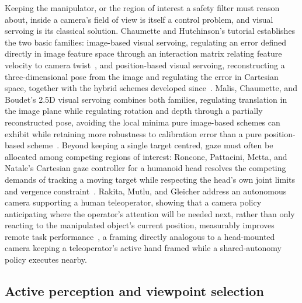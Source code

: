 \documentclass[12pt,a4paper,twoside,openright]{report}
\begin{document}
Keeping the manipulator, or the region of interest a safety filter must reason about, inside a camera's field of view is itself a control problem, and visual servoing is its classical solution. Chaumette and Hutchinson's tutorial establishes the two basic families: image-based visual servoing, regulating an error defined directly in image feature space through an interaction matrix relating feature velocity to camera twist~\cite{chaumette2006}, and position-based visual servoing, reconstructing a three-dimensional pose from the image and regulating the error in Cartesian space, together with the hybrid schemes developed since~\cite{chaumette2007advanced}. Malis, Chaumette, and Boudet's 2.5D visual servoing combines both families, regulating translation in the image plane while regulating rotation and depth through a partially reconstructed pose, avoiding the local minima pure image-based schemes can exhibit while retaining more robustness to calibration error than a pure position-based scheme~\cite{malis1999}. Beyond keeping a single target centred, gaze must often be allocated among competing regions of interest: Roncone, Pattacini, Metta, and Natale's Cartesian gaze controller for a humanoid head resolves the competing demands of tracking a moving target while respecting the head's own joint limits and vergence constraint~\cite{roncone2016gaze}. Rakita, Mutlu, and Gleicher address an autonomous camera supporting a human teleoperator, showing that a camera policy anticipating where the operator's attention will be needed next, rather than only reacting to the manipulated object's current position, measurably improves remote task performance~\cite{rakita2018autonomouscamera}, a framing directly analogous to a head-mounted camera keeping a teleoperator's active hand framed while a shared-autonomy policy executes nearby.

\subsection{Active perception and viewpoint selection}
\label{sec:sota-active-perception}
\end{document}
